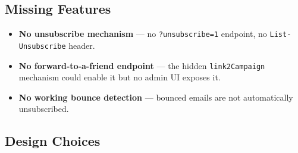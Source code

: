 \documentclass[11pt,a4paper]{article}
\begin{document}
\subsection{Missing Features}

\begin{itemize}[leftmargin=1.6em,itemsep=2pt]
  \item \textbf{No unsubscribe mechanism} --- no
        \texttt{?unsubscribe=1} endpoint, no
        \texttt{List-Unsubscribe} header.
  \item \textbf{No forward-to-a-friend endpoint} --- the hidden
        \texttt{link2Campaign} mechanism could enable it but no
        admin UI exposes it.
  \item \textbf{No working bounce detection} --- bounced emails
        are not automatically unsubscribed.
\end{itemize}

\subsection{Design Choices}
\end{document}
